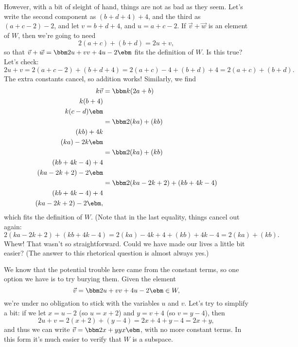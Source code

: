 {\begin{enumerate}
However, with a bit of sleight of hand, things are not as bad as they seem. Let's write the second component as $(b+d+4)+4$, and the third as $(a+c-2)-2$, and let $v=b+d+4$, and $u=a+c-2$. If $\vec v + \vec w$ is an element of $W$, then we're going to need
\[
2(a+c)+(b+d) = 2u+v,
\]
so that $\vec v + \vec w = \bbm 2u+v\\v+4\\u-2\ebm$ fits the definition of $W$. Is this true? Let's check:
\[
2u+v = 2(a+c-2)+(b+d+4) = 2(a+c)-4+(b+d)+4 = 2(a+c)+(b+d).
\]
\drawexampleline
The extra constants cancel, so addition works! Similarly, we find
\begin{align*}
k\vec v &= \bbm k(2a+b)\\k(b+4)\\k(c-d)\ebm \\
 & = \bbm 2(ka)+(kb)\\(kb)+4k\\(ka)-2k\ebm\\
 & = \bbm 2(ka)+(kb)\\(kb+4k-4)+4\\(ka-2k+2)-2\ebm\\
 & = \bbm 2(ka-2k+2)+(kb+4k-4)\\(kb+4k-4)+4\\(ka-2k+2)-2\ebm,
\end{align*}
which fits the definition of $W$. (Note that in the last equality, things cancel out again:
\[
2(ka-2k+2)+(kb+4k-4) = 2(ka)-4k+4+(kb)+4k-4 = 2(ka)+(kb).
\]
Whew! That wasn't so straightforward. Could we have made our lives a little bit easier? (The answer to this rhetorical question is almost always yes.)

We know that the potential trouble here came from the constant terms, so one option we have is to try burying them. Given the element 
\[
\vec v = \bbm 2u+v\\v+4\\u-2\ebm \in W,
\]
we're under no obligation to stick with the variables $u$ and $v$. Let's try to simplify a bit: if we let $x = u-2$ (so $u=x+2$) and $y = v+4$ (so $v=y-4$), then
\[
2u+v = 2(x+2)+(y-4) = 2x+4+y-4 = 2x+y,
\]
and thus we can write $\vec v = \bbm 2x+y\\y\\x\ebm$, with no more constant terms. In this form it's much easier to verify that $W$ is a subspace.
\end{enumerate}}

\medskip

